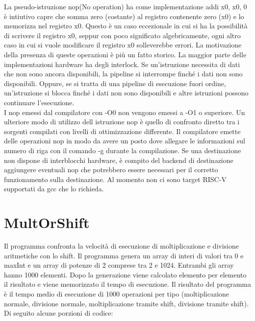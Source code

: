 \documentclass[12pt,a4paper]{report}
\begin{document}
La pseudo-istruzione nop(No operation) ha come implementazione addi x0, x0, 0 è intiutivo capre che somma zero (costante) al registro contenente zero (x0) e lo memorizza nel registro x0. Questo è un caso eccezionale in cui si ha la possibilità di scrivere il registro x0, seppur con poco significato algebricamente, ogni altro caso in cui si vuole modificare il registro x0 solleverebbe errori. La motivazione della presenza di queste operazioni è più un fatto storico.
La maggior parte delle implementazioni hardware ha degli interlock. Se un'istruzione necessita di dati che non sono ancora disponibili, la pipeline si interrompe finché i dati non sono disponibili. Oppure, se si tratta di una pipeline di esecuzione fuori ordine, un'istruzione si blocca finché i dati non sono disponibili e altre istruzioni possono continuare l'esecuzione.\\
I nop emessi dal compilatore con -O0  non vengono emessi a -O1 o superiore. Un ulteriore modo di utilizzo dell istruzione nop è quello di confronto diretto tra i sorgenti compilati con livelli di ottimizzazione differente. Il compilatore emette delle operazioni nop  in modo da avere un posto dove allegare le informazioni sul numero di riga con il comando -g durante la compilazione. Se una destinazione non dispone di interblocchi hardware, è compito del backend di destinazione aggiungere eventuali nop che potrebbero essere necessari per il corretto funzionamento sulla destinazione. Al momento non ci sono target RISC-V supportati da gcc che lo richieda.



\section{MultOrShift}
Il programma confronta la velocità di esecuzione di moltiplicazione e divisione aritmetiche con lo shift. Il programma genera un array di interi di valori tra 0 e maxInt e un array di potenze di 2 comprese tra 2 e 1024. Entrambi gli array hanno 1000 elementi. Dopo la generazione viene calcolato elemento per elemento il risultato e viene memorizzato il tempo di esecuzione. Il risultato del programma è il tempo medio di esecuzione di 1000 operazioni per tipo (moltiplicazione normale, divisione normale, moltiplicazione tramite shift, divisione tramite shift). Di seguito alcune porzioni di codice:




\end{document}
